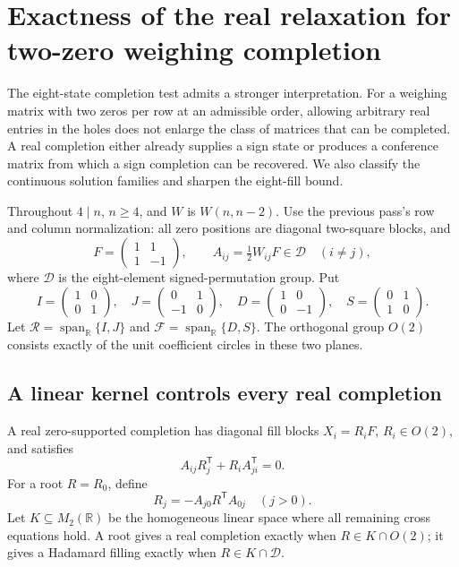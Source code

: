 \section{Exactness of the real relaxation for two-zero weighing completion}
\label{sec:real-weighing-exactness}

The eight-state completion test admits a stronger interpretation.
For a weighing matrix with two zeros per row at an admissible order,
allowing arbitrary real entries in the holes does not enlarge the
class of matrices that can be completed. A real completion either
already supplies a sign state or produces a conference matrix from
which a sign completion can be recovered. We also classify the
continuous solution families and sharpen the eight-fill bound.

Throughout $4\mid n$, $n\ge4$, and $W$ is $W(n,n-2)$. Use the
previous pass's row and column normalization: all zero positions
are diagonal two-square blocks, and
\[
 F=\begin{pmatrix}1&1\\1&-1\end{pmatrix},\qquad
 A_{ij}=\tfrac12W_{ij}F\in\mathcal D\quad(i\ne j),
\]
where $\mathcal D$ is the eight-element signed-permutation group.
Put
\[
 I=\begin{pmatrix}1&0\\0&1\end{pmatrix},\quad
 J=\begin{pmatrix}0&1\\-1&0\end{pmatrix},\quad
 D=\begin{pmatrix}1&0\\0&-1\end{pmatrix},\quad
 S=\begin{pmatrix}0&1\\1&0\end{pmatrix}.
\]
Let $\mathcal R=\operatorname{span}_{\mathbb R}\{I,J\}$ and
$\mathcal F=\operatorname{span}_{\mathbb R}\{D,S\}$.
The orthogonal group $O(2)$ consists exactly of the unit coefficient
circles in these two planes.

\subsection{A linear kernel controls every real completion}
A real zero-supported completion has diagonal fill blocks
$X_i=R_iF$, $R_i\in O(2)$, and satisfies
\[
 A_{ij}R_j^{\mathsf T}+R_iA_{ji}^{\mathsf T}=0.
\]
For a root $R=R_0$, define
\[
 R_j=-A_{j0}R^{\mathsf T}A_{0j}\quad(j>0).
\]
Let $K\subseteq M_2(\mathbb R)$ be the homogeneous linear space
where all remaining cross equations hold. A root gives a real
completion exactly when $R\in K\cap O(2)$; it gives a Hadamard
filling exactly when $R\in K\cap\mathcal D$.

